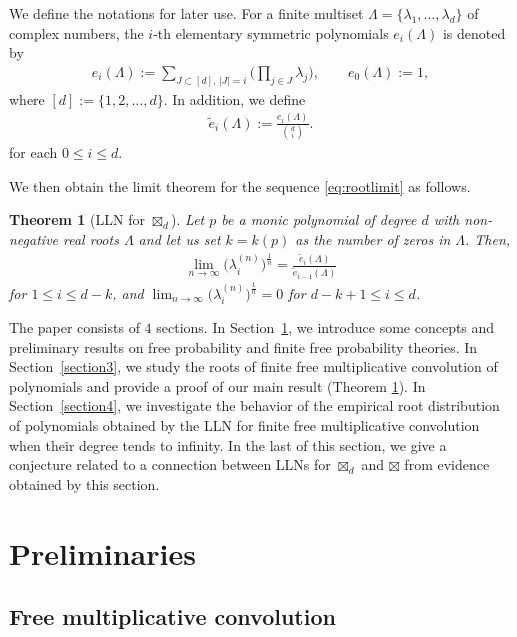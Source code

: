 \documentclass[pdftex]{sigma}
\newtheorem{Theorem}{Theorem}[section]
\numberwithin{equation}{section}
\begin{document}
We define the notations for later use.
For a finite multiset $\Lambda=\{\lambda_1,\dots, \lambda_d\}$ of complex numbers, the $i$-th elementary symmetric polynomials $e_i(\Lambda)$ is denoted by
\begin{align*}
e_i(\Lambda):= \sum_{J \subset [d],\, |J|=i} \bigg( \prod_{j \in J} \lambda_j \bigg), \qquad e_0(\Lambda):=1,
\end{align*}
where $[d]:=\{1,2,\dots, d\}$.
In addition, we define
\begin{align*}
\widetilde{e}_i(\Lambda):=\frac{e_i(\Lambda)}{\binom{d}{i}}.
\end{align*}
for each $0 \le i \le d$.

We then obtain the limit theorem for the sequence \eqref{eq:rootlimit} as follows.

\begin{Theorem}[LLN for $\boxtimes_d$]\label{thm:main}
Let $p$ be a monic polynomial of degree $d$ with non-negative real roots $\Lambda$ and let us set $k=k(p)$ as the number of zeros in $\Lambda$.
Then,
\begin{align*}
\lim_{n\rightarrow\infty } \big(\lambda_{i}^{(n)}\big)^{\frac{1}{n}} = \frac{\tilde{e}_i(\Lambda)}{\tilde{e}_{i-1}(\Lambda)}
\end{align*}
for $1\le i \le d-k$, and $\lim_{n\rightarrow\infty } \big(\lambda_{i}^{(n)}\big)^{\frac{1}{n}} =0$ for $d-k+1 \le i \le d$.
\end{Theorem}


The paper consists of $4$ sections.
In Section~\ref{section2}, we introduce some concepts and preliminary results on free probability and finite free probability theories. In Section~\ref{section3}, we study the roots of finite free multiplicative convolution of polynomials and provide a proof of our main result (Theorem \ref{thm:main}).
In Section~\ref{section4}, we investigate the behavior of the empirical root distribution of polynomials obtained by the LLN for finite free multiplicative convolution when their degree tends to infinity. In the last of this section, we give a conjecture related to a connection between LLNs for $\boxtimes_d$ and $\boxtimes$ from evidence obtained by this section.



\section{Preliminaries}\label{section2}
\subsection{Free multiplicative convolution}\label{section2.1}
\end{document}
